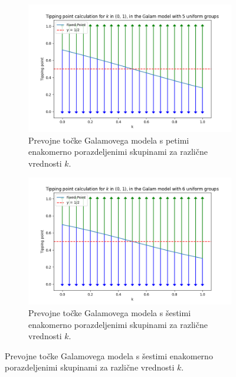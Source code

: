 \documentclass[a4paper,12pt]{article}
\begin{document}
\begin{figure}[ht!]
    \centering
    \begin{subfigure}{0.4\textwidth}
        \includegraphics[width=\textwidth]{a515.png}
        \caption{Prevojne točke Galamovega modela s petimi enakomerno porazdeljenimi skupinami za različne vrednosti $k$.}
        \label{fig:a515}
    \end{subfigure}
    \begin{subfigure}{0.4\textwidth}
        \includegraphics[width=\textwidth]{a616.png}
        \caption{Prevojne točke Galamovega modela s šestimi enakomerno porazdeljenimi skupinami za različne vrednosti $k$.}
        \label{fig:a616}
    \end{subfigure}
\end{figure}


\end{document}
